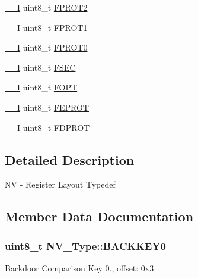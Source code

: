 \begin{DoxyCompactItemize}
\item 
\hyperlink{core__sc300_8h_af63697ed9952cc71e1225efe205f6cd3}{\+\_\+\+\_\+I} uint8\+\_\+t \hyperlink{structNV__Type_a4d8b08ba5cfdb89cf82724db412bc041}{F\+P\+R\+O\+T2}
\item 
\hyperlink{core__sc300_8h_af63697ed9952cc71e1225efe205f6cd3}{\+\_\+\+\_\+I} uint8\+\_\+t \hyperlink{structNV__Type_a4e85ed3eff018d579013a9e26e987f35}{F\+P\+R\+O\+T1}
\item 
\hyperlink{core__sc300_8h_af63697ed9952cc71e1225efe205f6cd3}{\+\_\+\+\_\+I} uint8\+\_\+t \hyperlink{structNV__Type_a0a1513e86bf3647e0179fc0f547a9b1e}{F\+P\+R\+O\+T0}
\item 
\hyperlink{core__sc300_8h_af63697ed9952cc71e1225efe205f6cd3}{\+\_\+\+\_\+I} uint8\+\_\+t \hyperlink{structNV__Type_afb5e12b7f518197a87e81432749ba73d}{F\+S\+EC}
\item 
\hyperlink{core__sc300_8h_af63697ed9952cc71e1225efe205f6cd3}{\+\_\+\+\_\+I} uint8\+\_\+t \hyperlink{structNV__Type_aaabff2875971400e0975d365fd8bdd30}{F\+O\+PT}
\item 
\hyperlink{core__sc300_8h_af63697ed9952cc71e1225efe205f6cd3}{\+\_\+\+\_\+I} uint8\+\_\+t \hyperlink{structNV__Type_aa28a9317d3ffe8a1501ad7c0b5a938bd}{F\+E\+P\+R\+OT}
\item 
\hyperlink{core__sc300_8h_af63697ed9952cc71e1225efe205f6cd3}{\+\_\+\+\_\+I} uint8\+\_\+t \hyperlink{structNV__Type_a3d5374b1acb568cfe13bd843cf5272d8}{F\+D\+P\+R\+OT}
\end{DoxyCompactItemize}


\subsection{Detailed Description}
NV -\/ Register Layout Typedef 

\subsection{Member Data Documentation}
\subsubsection[{\texorpdfstring{B\+A\+C\+K\+K\+E\+Y0}{BACKKEY0}}]{ uint8\+\_\+t N\+V\+\_\+\+Type\+::\+B\+A\+C\+K\+K\+E\+Y0}\hypertarget{structNV__Type_a84e62b140feac9fcae8b251607c814e7}{}\label{structNV__Type_a84e62b140feac9fcae8b251607c814e7}
Backdoor Comparison Key 0., offset\+: 0x3 
